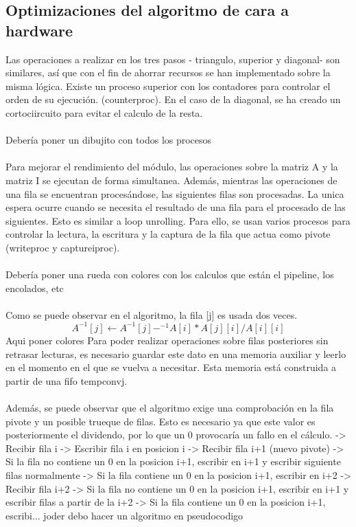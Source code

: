 \subsection{Optimizaciones del algoritmo de cara a hardware}
Las operaciones a realizar en los tres pasos - triangulo, superior y diagonal- son similares, así que con el fin de ahorrar recursos se han implementado sobre la misma lógica. Existe un proceso superior con los contadores para controlar el orden de su ejecución. (counterproc). En el caso de la diagonal, se ha creado un cortociircuito para evitar el calculo de la resta.
\\
\\
Debería poner un dibujito con todos los procesos
\\
\\
Para mejorar el rendimiento del módulo, las operaciones sobre la matriz A y la matriz I se ejecutan de forma simultanea. Además, mientras las operaciones de una fila se encuentran procesándose, las siguientes filas son procesadas. La unica espera ocurre cuando se necesita el resultado de una fila para el procesado de las siguientes. Esto es similar a loop unrolling. Para ello, se usan varios procesos para controlar la lectura, la escritura y la captura de la fila que actua como pivote (writeproc y captureiproc). 
\\
\\
Debería poner una rueda con colores con los calculos que están el pipeline, los encolados, etc
\\
\\
Como se puede observar en el algoritmo, la fila [j] es usada dos veces.
\[A^{-1}[j] \gets A^{-1}[j]-^{-1}A[i]*A[j][i]/A[i][i]\]
Aqui poner colores
Para poder realizar operaciones sobre filas posteriores sin retrasar lecturas, es necesario guardar este dato en una memoria auxiliar y leerlo en el momento en el que se vuelva a necesitar. Esta memoria está construida a partir de una fifo tempconvj.
\\
\\
Además, se puede observar que el algoritmo exige una comprobación en la fila pivote y un posible trueque de filas. Esto es necesario ya que este valor es posteriormente el dividendo, por lo que un 0 provocaría un fallo en el cálculo.
-> Recibir fila i
-> Escribir fila i en posicion i
-> Recibir fila i+1 (nuevo pivote)
-> Si la fila no contiene un 0 en la posicion i+1, escribir en i+1 y escribir siguiente filas normalmente
-> Si la fila contiene un 0 en la posicion i+1, escribir en i+2
-> Recibir fila i+2
-> Si la fila no contiene un 0 en la posicion i+1, escribir en i+1 y escribir filas a partir de la i+2
-> Si la fila contiene un 0 en la posicion i+1, escribi...
joder debo hacer un algoritmo en pseudocodigo



